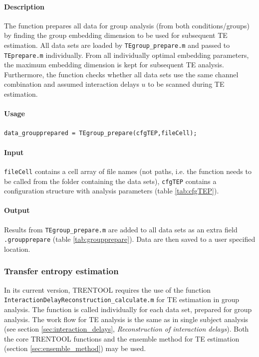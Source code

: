 \documentclass[a4paper,10pt]{article}
\begin{document}
\paragraph*{Description} The function prepares all data for group analysis (from both conditions/groups) by finding the group embedding dimension to be used for subsequent TE estimation. All data sets  are loaded by \verb&TEgroup_prepare.m& and passed to \verb&TEprepare.m& individually. From all individually optimal embedding parameters, the maximum embedding dimension is kept for subsequent TE analysis. Furthermore, the function checks whether all data sets use the same channel combination and assumed interaction delays $u$ to be scanned during TE estimation.

\paragraph*{Usage} \verb&data_groupprepared = TEgroup_prepare(cfgTEP,fileCell);&

\paragraph*{Input} \verb&fileCell& contains a cell array of file names (not paths, i.e. the function needs to be called from the folder containing the data sets), \verb&cfgTEP& contains a configuration structure with analysis parameters (table \ref{tab:cfgTEP}).

\paragraph*{Output} Results from \verb&TEgroup_prepare.m& are added to all data sets as an extra field \verb&.groupprepare& (table \ref{tab:groupprepare}). Data are then saved to a user specified location.

\subsubsection{Transfer entropy estimation} 

In its current version, TRENTOOL requires the use of the function \verb&InteractionDelayReconstruction_calculate.m& for TE estimation in group analysis. The function is called individually for each data set, prepared for group analysis. The work flow for TE analysis is the same as in single subject analysis (see section \ref{sec:interaction_delays}, \textit{Reconstruction of interaction delays}). Both the core TRENTOOL functions and the ensemble method for TE estimation (section \ref{sec:ensemble_method}) may be used. 
\end{document}
